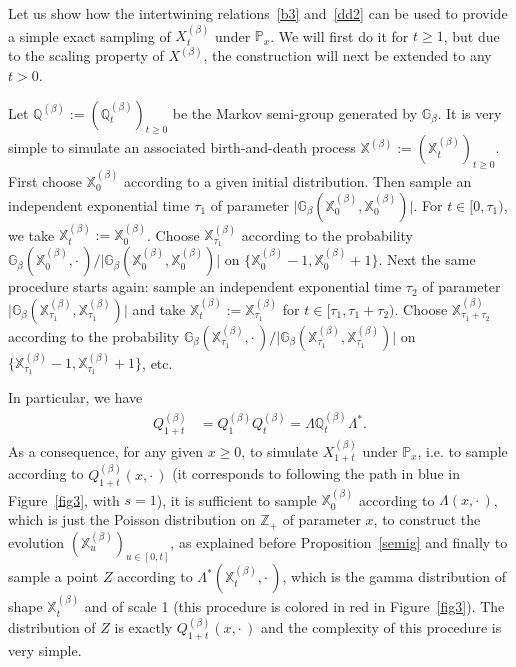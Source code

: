 \documentclass[10pt]{amsart}
\theoremstyle{definition}\newtheorem{defi}[theo]{Definition}\newtheorem{rema}[theo]{Remark}\newtheorem{exam}[theo]{Example}\newtheorem{exem}[theo]{Example}\newtheorem{nota}[theo]{Notation}
\newcommand{\df}{\mathrel{:=}}
\newcommand{\cX}{{\discret X}}
\newcommand{\PP}{\mathbb{P}}
\newcommand{\ZZ}{\mathbb{Z}}
\newcommand{\dBg}{{\discret{G}}}
\newcommand{\dBs}{{\discret{Q}}}
\newcommand{\Bs}{Q}
\newcommand{\discret}[1]{\mathds{#1}}
\newcommand{\adjL}{\Lambda^*}
\begin{document}
Let us show how the intertwining relations~\eqref{b3} and~\eqref{dd2} can be used to provide a simple exact sampling of $X^{(\beta)}_t$ under $\PP_x$. We will first do it for $t\geq 1$, but due to the scaling property of $X^{(\beta)}$, the construction will next be extended to any $t>0$.

Let $\dBs^{(\beta)}\df(\dBs^{(\beta)}_t)_{t\geq 0}$ be the Markov semi-group generated by $\dBg_{\beta}$. It is very simple to simulate an associated birth-and-death process $\cX^{(\beta)}\df(\cX_t^{(\beta)})_{t\geq 0}$. First choose $\cX_0^{(\beta)}$ according to a given initial distribution. Then sample an independent exponential time $\tau_1$ of parameter $\vert \dBg_{\beta}(\cX^{(\beta)}_0,\cX^{(\beta)}_0)\vert$. For $t\in[0,\tau_1)$, we take $\cX^{(\beta)}_t\df \cX^{(\beta)}_0$. Choose $\cX^{(\beta)}_{\tau_1}$ according to the probability $\dBg_{\beta}(\cX^{(\beta)}_0,{\cdot\,})/\vert \dBg_{\beta}(\cX^{(\beta)}_0,\cX^{(\beta)}_0)\vert$ on $\{\cX^{(\beta)}_0-1, \cX^{(\beta)}_0+1\}$. Next the same procedure starts again: sample an independent exponential time $\tau_2$ of parameter $\vert \dBg_{\beta}(\cX^{(\beta)}_{\tau_1},\cX^{(\beta)}_{\tau_1})\vert$ and take $\cX^{(\beta)}_t\df \cX^{(\beta)}_{\tau_1}$ for $t\in[\tau_1,\tau_1+\tau_2)$. Choose $\cX^{(\beta)}_{\tau_1+\tau_2}$ according to the probability $\dBg_{\beta}(\cX^{(\beta)}_{\tau_1},{\cdot\,})/\vert \dBg_{\beta}(\cX^{(\beta)}_{\tau_1},\cX^{(\beta)}_{\tau_1})\vert$ on $\{\cX^{(\beta)}_{\tau_1}-1, \cX^{(\beta)}_{\tau_1}+1\}$, etc.

In particular, we have
\begin{align*}
\Bs^{(\beta)}_{1+t}&=\Bs^{(\beta)}_{1}\Bs^{(\beta)}_{t}=\Lambda \dBs^{(\beta)}_t\adjL.
\end{align*}
As a consequence, for any given $x\geq 0$, to simulate $X^{(\beta)}_{1+t}$ under $\PP_x$, i.e. to sample according to $\Bs^{(\beta)}_{1+t}(x,{\cdot\,})$ (it corresponds to following the path in blue in Figure~\ref{fig3}, with $s=1$), it is sufficient to sample $\cX_0^{(\beta)}$ according to $\Lambda(x,{\cdot\,})$, which is just the Poisson distribution on $\ZZ_+$ of parameter $x$, to construct the evolution $(\cX^{(\beta)}_u)_{u\in[0,t]}$, as explained before Proposition~\ref{semig} and finally to sample a point $Z$ according to $\adjL (\cX^{(\beta)}_t,{\cdot\,})$, which is the gamma distribution of shape $\cX^{(\beta)}_t$ and of scale 1 (this procedure is colored in red in Figure~\ref{fig3}). The distribution of $Z$ is exactly $\Bs^{(\beta)}_{1+t}(x,{\cdot\,})$ and the complexity of this procedure is very simple.
\end{document}
